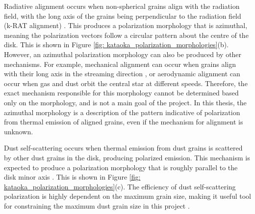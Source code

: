 





Radiative alignment occurs when non-spherical grains align with the radiation field, with the long axis of the grains being perpendicular to the radiation field (k-RAT alignment) \citep{Tazaki2017}. This produces a polarization morphology that is azimuthal, meaning the polarization vectors follow a circular pattern about the centre of the disk. This is shown in Figure \ref{fig: kataoka_polarization_morphologies}(b). However, an azimuthal polarization morphology can also be produced by other mechanisms. For example, mechanical alignment can occur when grains align with their long axis in the streaming direction \citep{WurmBlum2000, Lin2024}, or aerodynamic alignment can occur when gas and dust orbit the central star at different speeds. Therefore, the exact mechanism responsible for this morphology cannot be determined based only on the morphology, and is not a main goal of the project. In this thesis, the azimuthal morphology is a description of the pattern indicative of polarization from thermal emission of aligned grains, even if the mechanism for alignment is unknown.










Dust self-scattering occurs when thermal emission from dust grains is scattered by other dust grains in the disk, producing polarized emission. This mechanism is expected to produce a polarization morphology that is roughly parallel to the disk minor axis \citep{Kataoka_2017}. This is shown in Figure \ref{fig: kataoka_polarization_morphologies}(c). The efficiency of dust self-scattering polarization is highly dependent on the maximum grain size, making it useful tool for constraining the maximum dust grain size in this project \citep{Harrison2024}.

























